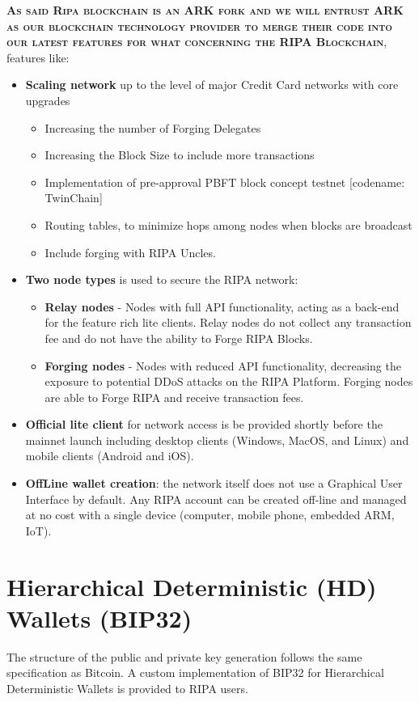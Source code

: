 \documentclass[11pt,fleqn,oneside]{book} %
\begin{document}
\vspace{5mm}
\textsc{\textbf{As said Ripa blockchain is an ARK fork and we will entrust ARK as our blockchain technology provider to merge their 
code into our latest features for what concerning the RIPA Blockchain}}, features like:
\begin{itemize}
	\item \textbf{Scaling network} up to the level of major Credit Card networks with core upgrades
	\begin{itemize}
		\item Increasing the number of Forging Delegates
		\item Increasing the Block Size to include more transactions
		\item Implementation of pre-approval PBFT block concept testnet [codename:
		TwinChain]
		\item Routing tables, to minimize hops among nodes when blocks are broadcast
		\item Include forging with RIPA Uncles.	
	\end{itemize}
	\item \textbf{Two node types} is used to secure the RIPA network:
	\begin{itemize}
		\item \textbf{Relay nodes} - Nodes with full API functionality, acting as a back-end for the
		feature rich lite clients. Relay nodes do not collect any transaction fee and do
		not have the ability to Forge RIPA Blocks.
		\item \textbf{Forging nodes} - Nodes with reduced API functionality, decreasing the
		exposure to potential DDoS attacks on the RIPA Platform. Forging nodes are
		able to Forge RIPA and receive transaction fees.
	\end{itemize}
	\item \textbf{Official lite client} for network access is be provided shortly before the mainnet
	launch including desktop clients (Windows, MacOS, and Linux) and mobile clients
	(Android and iOS).
	\item \textbf{OffLine wallet creation}: the network itself does not use a Graphical User Interface by default. Any RIPA
	account can be created off-line and managed at no cost with a single device
	(computer, mobile phone, embedded ARM, IoT).
\end{itemize}

\section{Hierarchical Deterministic (HD) Wallets (BIP32)}
The structure of the public and private key generation follows the same specification
as Bitcoin. A custom implementation of BIP32 for Hierarchical Deterministic Wallets
is provided to RIPA users.
\end{document}

